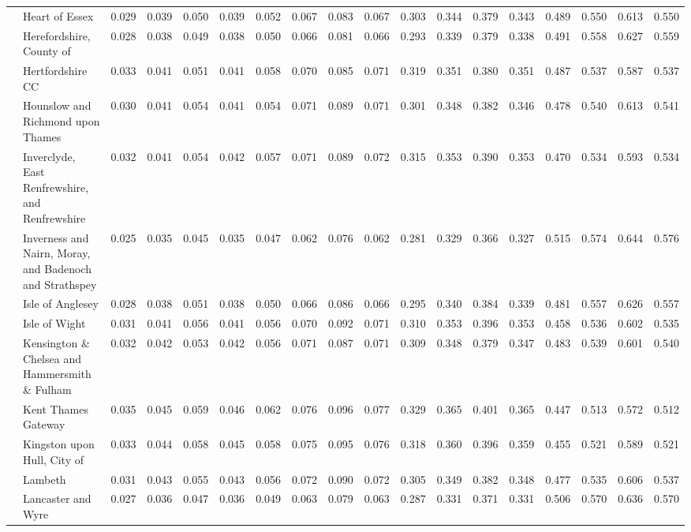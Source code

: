 \begin{tabular}{llrrrrrrrrrrrrrrrr}
 & Heart of Essex & 0.029 & 0.039 & 0.050 & 0.039 & 0.052 & 0.067 & 0.083 & 0.067 & 0.303 & 0.344 & 0.379 & 0.343 & 0.489 & 0.550 & 0.613 & 0.550 \\
 & Herefordshire, County of & 0.028 & 0.038 & 0.049 & 0.038 & 0.050 & 0.066 & 0.081 & 0.066 & 0.293 & 0.339 & 0.379 & 0.338 & 0.491 & 0.558 & 0.627 & 0.559 \\
 & Hertfordshire CC & 0.033 & 0.041 & 0.051 & 0.041 & 0.058 & 0.070 & 0.085 & 0.071 & 0.319 & 0.351 & 0.380 & 0.351 & 0.487 & 0.537 & 0.587 & 0.537 \\
 & Hounslow and Richmond upon Thames & 0.030 & 0.041 & 0.054 & 0.041 & 0.054 & 0.071 & 0.089 & 0.071 & 0.301 & 0.348 & 0.382 & 0.346 & 0.478 & 0.540 & 0.613 & 0.541 \\
 & Inverclyde, East Renfrewshire, and Renfrewshire & 0.032 & 0.041 & 0.054 & 0.042 & 0.057 & 0.071 & 0.089 & 0.072 & 0.315 & 0.353 & 0.390 & 0.353 & 0.470 & 0.534 & 0.593 & 0.534 \\
 & Inverness and Nairn, Moray, and Badenoch and Strathspey & 0.025 & 0.035 & 0.045 & 0.035 & 0.047 & 0.062 & 0.076 & 0.062 & 0.281 & 0.329 & 0.366 & 0.327 & 0.515 & 0.574 & 0.644 & 0.576 \\
 & Isle of Anglesey & 0.028 & 0.038 & 0.051 & 0.038 & 0.050 & 0.066 & 0.086 & 0.066 & 0.295 & 0.340 & 0.384 & 0.339 & 0.481 & 0.557 & 0.626 & 0.557 \\
 & Isle of Wight & 0.031 & 0.041 & 0.056 & 0.041 & 0.056 & 0.070 & 0.092 & 0.071 & 0.310 & 0.353 & 0.396 & 0.353 & 0.458 & 0.536 & 0.602 & 0.535 \\
 & Kensington \& Chelsea and Hammersmith \& Fulham & 0.032 & 0.042 & 0.053 & 0.042 & 0.056 & 0.071 & 0.087 & 0.071 & 0.309 & 0.348 & 0.379 & 0.347 & 0.483 & 0.539 & 0.601 & 0.540 \\
 & Kent Thames Gateway & 0.035 & 0.045 & 0.059 & 0.046 & 0.062 & 0.076 & 0.096 & 0.077 & 0.329 & 0.365 & 0.401 & 0.365 & 0.447 & 0.513 & 0.572 & 0.512 \\
 & Kingston upon Hull, City of & 0.033 & 0.044 & 0.058 & 0.045 & 0.058 & 0.075 & 0.095 & 0.076 & 0.318 & 0.360 & 0.396 & 0.359 & 0.455 & 0.521 & 0.589 & 0.521 \\
 & Lambeth & 0.031 & 0.043 & 0.055 & 0.043 & 0.056 & 0.072 & 0.090 & 0.072 & 0.305 & 0.349 & 0.382 & 0.348 & 0.477 & 0.535 & 0.606 & 0.537 \\
 & Lancaster and Wyre & 0.027 & 0.036 & 0.047 & 0.036 & 0.049 & 0.063 & 0.079 & 0.063 & 0.287 & 0.331 & 0.371 & 0.331 & 0.506 & 0.570 & 0.636 & 0.570 \\

\end{tabular}
